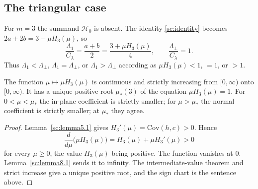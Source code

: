 \subsection{The triangular case}\label{sc:sub10}

For \(m=3\) the summand \(\mathcal H_0\) is absent. The identity \eqref{sc:identity} becomes \(2a+2b=3+\mu H_3(\mu)\), so
\[
\frac{\Lambda_1}{C_\lambda}=\frac{a+b}{2}=\frac{3+\mu H_3(\mu)}{4},\qquad \frac{\Lambda_\perp}{C_\lambda}=1.
\]
Thus \(\Lambda_1<\Lambda_\perp\), \(\Lambda_1=\Lambda_\perp\), or \(\Lambda_1>\Lambda_\perp\) according as \(\mu H_3(\mu)<1\), \(=1\), or \(>1\).

\begin{theorem}\label{sc:theorem10.1}
The function \(\mu\mapsto\mu H_3(\mu)\) is continuous and strictly increasing from \([0,\infty)\) onto \([0,\infty)\). It has a unique positive root \(\mu_*(3)\) of the equation \(\mu H_3(\mu)=1\). For \(0<\mu<\mu_*\) the in-plane coefficient is strictly smaller; for \(\mu>\mu_*\) the normal coefficient is strictly smaller; at \(\mu_*\) they agree.

\end{theorem}
\begin{proof}
Lemma~\ref{sc:lemma5.1} gives \(H_3'(\mu)=\mathrm{Cov}(h,c)>0\). Hence
\[
\frac{d}{d\mu}\bigl(\mu H_3(\mu)\bigr)=H_3(\mu)+\mu H_3'(\mu)>0
\]
for every \(\mu\ge 0\), the value \(H_3(\mu)\) being positive. The function vanishes at \(0\). Lemma~\ref{sc:lemma8.1} sends it to infinity. The intermediate-value theorem and strict increase give a unique positive root, and the sign chart is the sentence above.

\end{proof}
